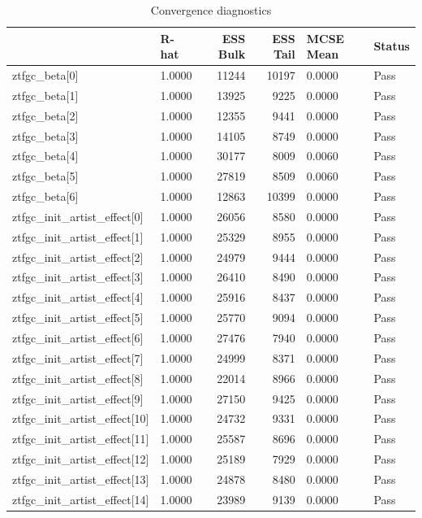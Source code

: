 \begin{table}[htbp]
\caption{Convergence diagnostics}
\label{tab:diagnostics}
\begin{tabular}{llrrll}
\toprule
 & R-hat & ESS Bulk & ESS Tail & MCSE Mean & Status \\
\midrule
ztfgc\_beta[0] & 1.0000 & 11244 & 10197 & 0.0000 & Pass \\
ztfgc\_beta[1] & 1.0000 & 13925 & 9225 & 0.0000 & Pass \\
ztfgc\_beta[2] & 1.0000 & 12355 & 9441 & 0.0000 & Pass \\
ztfgc\_beta[3] & 1.0000 & 14105 & 8749 & 0.0000 & Pass \\
ztfgc\_beta[4] & 1.0000 & 30177 & 8009 & 0.0060 & Pass \\
ztfgc\_beta[5] & 1.0000 & 27819 & 8509 & 0.0060 & Pass \\
ztfgc\_beta[6] & 1.0000 & 12863 & 10399 & 0.0000 & Pass \\
ztfgc\_init\_artist\_effect[0] & 1.0000 & 26056 & 8580 & 0.0000 & Pass \\
ztfgc\_init\_artist\_effect[1] & 1.0000 & 25329 & 8955 & 0.0000 & Pass \\
ztfgc\_init\_artist\_effect[2] & 1.0000 & 24979 & 9444 & 0.0000 & Pass \\
ztfgc\_init\_artist\_effect[3] & 1.0000 & 26410 & 8490 & 0.0000 & Pass \\
ztfgc\_init\_artist\_effect[4] & 1.0000 & 25916 & 8437 & 0.0000 & Pass \\
ztfgc\_init\_artist\_effect[5] & 1.0000 & 25770 & 9094 & 0.0000 & Pass \\
ztfgc\_init\_artist\_effect[6] & 1.0000 & 27476 & 7940 & 0.0000 & Pass \\
ztfgc\_init\_artist\_effect[7] & 1.0000 & 24999 & 8371 & 0.0000 & Pass \\
ztfgc\_init\_artist\_effect[8] & 1.0000 & 22014 & 8966 & 0.0000 & Pass \\
ztfgc\_init\_artist\_effect[9] & 1.0000 & 27150 & 9425 & 0.0000 & Pass \\
ztfgc\_init\_artist\_effect[10] & 1.0000 & 24732 & 9331 & 0.0000 & Pass \\
ztfgc\_init\_artist\_effect[11] & 1.0000 & 25587 & 8696 & 0.0000 & Pass \\
ztfgc\_init\_artist\_effect[12] & 1.0000 & 25189 & 7929 & 0.0000 & Pass \\
ztfgc\_init\_artist\_effect[13] & 1.0000 & 24878 & 8480 & 0.0000 & Pass \\
ztfgc\_init\_artist\_effect[14] & 1.0000 & 23989 & 9139 & 0.0000 & Pass \\

\end{tabular}
\end{table}
